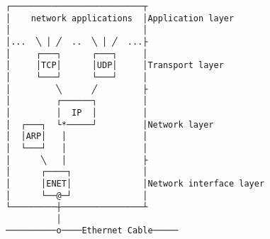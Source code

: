 \documentclass[varwidth,crop]{standalone}
\begin{document}
\begin{verbatim}
┌──────────────────────────┬
│    network applications  │Application layer
│                          │
│...  ╲ │ ╱  ..  ╲ │ ╱  ...├
│     ┌───┐      ┌───┐     │
│     │TCP│      │UDP│     │Transport layer
│     └───┘      └───┘     │ 
│         ╲      ╱         ├
│         ┌──────┐         │
│         │  IP  │         │
│  ┌───┐  └*─────┘         │Network layer
│  │ARP│   │               │
│  └───┘   │               │
│      ╲   │               ├
│      ┌────┐              │
│      │ENET│              │Network interface layer
│      └──@─┘              │ 
└─────────┼────────────────┴
          │
──────────o────Ethernet Cable─────
\end{verbatim}
\end{document}
